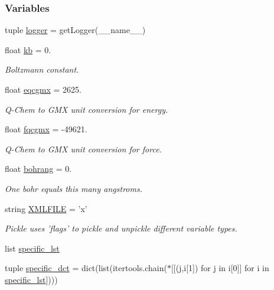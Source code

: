 \subsubsection*{Variables}
\begin{DoxyCompactItemize}
\item 
tuple \hyperlink{namespaceforcebalance_1_1nifty_a1859e992ed983dbbcc8093fdd19710e7}{logger} = get\-Logger(\-\_\-\-\_\-name\-\_\-\-\_\-)
\item 
float \hyperlink{namespaceforcebalance_1_1nifty_ae0916a3186f4f8b238a0d58bb9f6a3da}{kb} = 0.
\begin{DoxyCompactList}\small\item\em Boltzmann constant. \end{DoxyCompactList}\item 
float \hyperlink{namespaceforcebalance_1_1nifty_a7cec4d46378b888cd867de05d0168d96}{eqcgmx} = 2625.
\begin{DoxyCompactList}\small\item\em Q-\/\-Chem to G\-M\-X unit conversion for energy. \end{DoxyCompactList}\item 
float \hyperlink{namespaceforcebalance_1_1nifty_ab1ec21beaae0d8328e7e4c3b89d972ab}{fqcgmx} = -\/49621.
\begin{DoxyCompactList}\small\item\em Q-\/\-Chem to G\-M\-X unit conversion for force. \end{DoxyCompactList}\item 
float \hyperlink{namespaceforcebalance_1_1nifty_a31a8d4a4240a1325bd4fa10033b7eee0}{bohrang} = 0.
\begin{DoxyCompactList}\small\item\em One bohr equals this many angstroms. \end{DoxyCompactList}\item 
string \hyperlink{namespaceforcebalance_1_1nifty_a338d5080f95188c37271c306f64093d8}{X\-M\-L\-F\-I\-L\-E} = 'x'
\begin{DoxyCompactList}\small\item\em Pickle uses 'flags' to pickle and unpickle different variable types. \end{DoxyCompactList}\item 
list \hyperlink{namespaceforcebalance_1_1nifty_abe850bcdf26cec4a0cf913a54a7ddfaa}{specific\-\_\-lst}
\item 
tuple \hyperlink{namespaceforcebalance_1_1nifty_ab652c941890b0f378100433699c8d255}{specific\-\_\-dct} = dict(list(itertools.\-chain($\ast$\mbox{[}\mbox{[}(j,i\mbox{[}1\mbox{]}) for j in i\mbox{[}0\mbox{]}\mbox{]} for i in \hyperlink{namespaceforcebalance_1_1nifty_abe850bcdf26cec4a0cf913a54a7ddfaa}{specific\-\_\-lst}\mbox{]})))
\end{DoxyCompactItemize}


